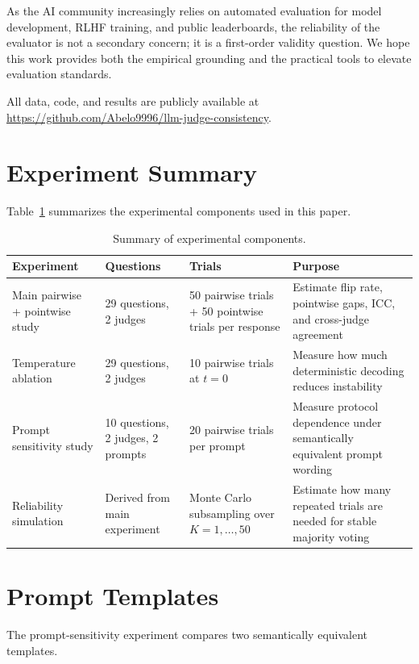 \documentclass{ijclclp}
\begin{document}
As the AI community increasingly relies on automated evaluation for model development, RLHF training, and public leaderboards, the reliability of the evaluator is not a secondary concern; it is a first-order validity question. We hope this work provides both the empirical grounding and the practical tools to elevate evaluation standards.

All data, code, and results are publicly available at \url{https://github.com/Abelo9996/llm-judge-consistency}.

\appendix

\section{Experiment Summary}

Table~\ref{tab:exp_summary} summarizes the experimental components used in this paper.

\begin{table}[h]
\centering
\caption{Summary of experimental components.}
\label{tab:exp_summary}
\begin{tabular}{p{}p{}p{}p{}}
\toprule
\textbf{Experiment} & \textbf{Questions} & \textbf{Trials} & \textbf{Purpose} \\
\midrule
Main pairwise + pointwise study & 29 questions, 2 judges & 50 pairwise trials + 50 pointwise trials per response & Estimate flip rate, pointwise gaps, ICC, and cross-judge agreement \\
Temperature ablation & 29 questions, 2 judges & 10 pairwise trials at $t=0$ & Measure how much deterministic decoding reduces instability \\
Prompt sensitivity study & 10 questions, 2 judges, 2 prompts & 20 pairwise trials per prompt & Measure protocol dependence under semantically equivalent prompt wording \\
Reliability simulation & Derived from main experiment & Monte Carlo subsampling over $K=1,\dots,50$ & Estimate how many repeated trials are needed for stable majority voting \\
\bottomrule
\end{tabular}
\end{table}

\section{Prompt Templates}

The prompt-sensitivity experiment compares two semantically equivalent templates.
\end{document}
